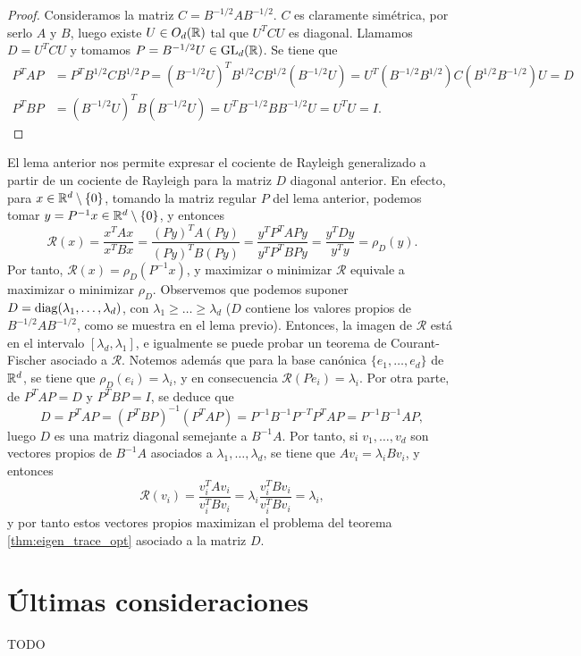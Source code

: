 \begin{proof}
    Consideramos la matriz $C = B^{-1/2}AB^{-1/2}$. $C$ es claramente simétrica, por serlo $A$ y $B$, luego existe $U \in O_d(\mathbb{R})$ tal que $U^TCU$ es diagonal. Llamamos $D = U^TCU$ y tomamos $P = B^{-1/2}U \in \operatorname{GL}_d(\mathbb{R})$. Se tiene que
    \begin{align*}
        P^TAP &= P^TB^{1/2}CB^{1/2}P = (B^{-1/2}U)^TB^{1/2}CB^{1/2}(B^{-1/2}U) = U^T(B^{-1/2}B^{1/2})C(B^{1/2}B^{-1/2})U = D \\
        P^TBP &= (B^{-1/2}U)^TB(B^{-1/2}U) = U^TB^{-1/2}BB^{-1/2}U = U^TU = I.
    \end{align*}
\end{proof}

El lema anterior nos permite expresar el cociente de Rayleigh generalizado a partir de un cociente de Rayleigh para la matriz $D$ diagonal anterior. En efecto, para $x \in \mathbb{R}^d \setminus \{0\}$, tomando la matriz regular $P$ del lema anterior, podemos tomar $y = P^{-1}x \in \mathbb{R}^d\setminus\{0\}$, y entonces
\[ \mathcal{R}(x) = \frac{x^TAx}{x^TBx} = \frac{(Py)^TA(Py)}{(Py)^TB(Py)} = \frac{y^TP^TAPy}{y^TP^TBPy} = \frac{y^TDy}{y^Ty} = \rho_D(y). \]
Por tanto, $\mathcal{R}(x) = \rho_D(P^{-1}x)$, y maximizar o minimizar $\mathcal{R}$ equivale a maximizar o minimizar $\rho_D$. Observemos que podemos suponer $D = \operatorname{diag}(\lambda_1,\dots,\lambda_d)$, con $\lambda_1 \ge \dots \ge \lambda_d$ ($D$ contiene los valores propios de $B^{-1/2}AB^{-1/2}$, como se muestra en el lema previo). Entonces, la imagen de $\mathcal{R}$ está en el intervalo $[\lambda_d,\lambda_1]$, e igualmente se puede probar un teorema de Courant-Fischer asociado a $\mathcal{R}$. Notemos además que para la base canónica $\{e_1,\dots,e_d\}$ de $\mathbb{R}^d$, se tiene que $\rho_D(e_i) = \lambda_i$, y en consecuencia $\mathcal{R}(Pe_i) = \lambda_i$. Por otra parte, de $P^TAP = D$ y $P^TBP = I$, se deduce que
\[ D = P^TAP = (P^TBP)^{-1}(P^TAP) = P^{-1}B^{-1}P^{-T}P^TAP = P^{-1}B^{-1}AP, \]
luego $D$ es una matriz diagonal semejante a $B^{-1}A$. Por tanto, si $v_1, \dots, v_d$ son vectores propios de $B^{-1}A$ asociados a $\lambda_1,\dots,\lambda_d$, se tiene que $Av_i = \lambda_iBv_i$, y entonces
\[ \mathcal{R}(v_i) = \frac{v_i^TAv_i}{v_i^TBv_i} = \lambda_i\frac{v_i^TBv_i}{v_i^TBv_i} = \lambda_i, \]
y por tanto estos vectores propios maximizan el problema del teorema \ref{thm:eigen_trace_opt} asociado a la matriz $D$.

\section{Últimas consideraciones}

TODO